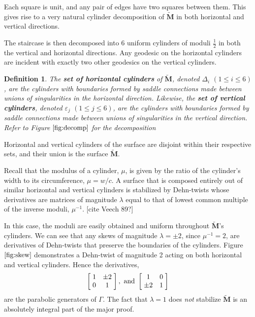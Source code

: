 \documentclass[]{article}
\newtheorem{Def}{Definition}[subsection]
\begin{document}
Each square is unit, and any pair of edges have two squares between them. This gives rise to a very natural cylinder decomposition of $\tilde{\mathbf{M}}$ in both horizontal and vertical directions.



The staircase is then decomposed into 6 uniform cylinders of moduli $\frac{1}{2}$ in both the vertical and horizontal directions. Any geodesic on the horizontal cylinders are incident with exactly two other geodesics on the vertical cylinders.

\begin{Def}
The \textbf{set of horizontal cylinders} of $\tilde{\mathbf{M}}$, denoted $\Delta_{i}$ $(1\leq i \leq 6)$, are the cylinders with boundaries formed by saddle connections made between unions of singularities in the horizontal direction. \newline
Likewise, the \textbf{set of vertical cylinders}, denoted $\varepsilon_j$ $(1\leq j 
\leq 6)$, are the cylinders with boundaries formed by saddle connections made between unions of singularities in the vertical direction. \newline
Refer to Figure $\ref{fig:decomp}$ for the decomposition
\end{Def}

Horizontal and vertical cylinders of the surface are disjoint within their respective sets, and their union is the surface $\tilde{\mathbf{M}}$.

  Recall that the modulus of a cylinder, $\mu$, is given by the ratio of the cylinder's width to its circumference, $\mu{}={}w/c$. A surface that is composed entirely out of similar horizontal and vertical cylinders is stabilized by Dehn-twists whose derivatives are matrices of magnitude $\lambda$ equal to that of lowest common multiple of the inverse moduli, $\mu^{-1}$. [cite Veech 89?]



In this case, the moduli are easily obtained and uniform throughout $\tilde{\mathbf{M}}$'s cylinders. We can see that any skews of magnitude $\lambda=\pm2$, since $\mu^{-1}{}=2$, are derivatives of Dehn-twists that preserve the boundaries of the cylinders. Figure $\ref{fig:skew}$ demonstrates a Dehn-twist of magnitude 2 acting on both horizontal and vertical cylinders. Hence the derivatives, 
\begin{equation}
\left[ \hspace{1mm} \begin{matrix}
				1 & \pm 2\\
				0 & 1
			\end{matrix}\hspace{1mm}\right],\text{ and }
			\left[ \hspace{1mm} \begin{matrix}
							1 & 0\\
							\pm 2 & 1
						\end{matrix}\hspace{1mm}\right]
\end{equation}
are the parabolic generators of $\Gamma$. The fact that $\lambda=1$ does \emph{not} stabilize $\tilde{\mathbf{M}}$ is an absolutely integral part of the major proof.
\end{document}

